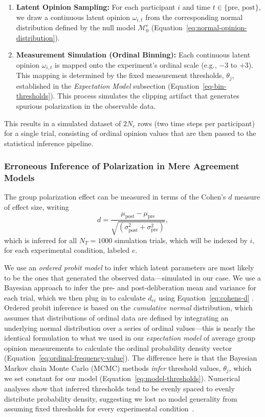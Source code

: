 \documentclass[preview]{article}
\newcommand{\mupre}{\mu_\mathrm{pre}}
\newcommand{\mupost}{\mu_\mathrm{post}}
\newcommand{\sigmapre}{\sigma_\mathrm{pre}}
\newcommand{\sigmapost}{\sigma_\mathrm{post}}
\newcommand{\nullmodel}{\mathcal{M}_0}
\begin{document}
\begin{enumerate}
\def\labelenumi{\arabic{enumi}.}
\item
  \textbf{Latent Opinion Sampling:} For each participant $i$ and time
  $t \in \{\text{pre, post}\}$, we draw a continuous latent opinion
  $\omega_{i,t}$ from the corresponding normal distribution defined by
  the null model $\nullmodel^e$ (Equation~\ref{eq:normal-opinion-distribution}).
\item
  \textbf{Measurement Simulation (Ordinal Binning):} Each continuous
  latent opinion $\omega_{i,t}$ is mapped onto the experiment's
  ordinal scale (e.g., $-3$ to $+3$). This mapping is determined by
  the fixed measurement thresholds, $\theta_j$, established in the
  \emph{Expectation Model} subsection
  (Equation~\ref{eq-bin-thresholds}). This process simulates the
  clipping artifact that generates spurious polarization in the
  observable data.
\end{enumerate}

This results in a simulated dataset of $2N_e$ rows (two time steps per
participant) for a single trial, consisting of ordinal opinion values
that are then passed to the statistical inference pipeline.


\subsubsection{Erroneous Inference of Polarization in Mere Agreement Models}
\label{erroneous-inference-model}

The group polarization effect can be measured in terms of the Cohen's $d$ measure of
effect size, writing
\begin{equation}
  d = \frac{\mupost - \mupre}{\sqrt{(\sigmapost^2 + \sigmapre^2)}},
  \label{eq:cohens-d}
\end{equation}
\noindent
which is inferred for all $N_T=1000$ simulation trials, which will be indexed by
$i$, for each experimental condition, labeled $e$.

We use an \emph{ordered probit model} to infer which latent parameters 
are most likely to be the ones that generated the observed data—simulated in our
case. We use a Bayesian approach to infer the pre- and post-deliberation mean
and variance for each trial, which we then plug in to calculate $d_{ei}$ 
using Equation~\ref{eq:cohens-d} \cite{Liddell2018}. Ordered
probit inference is based on the \emph{cumulative normal} distribution, which
assumes that distributions of ordinal data are defined by integrating an underlying
normal distribution over a series of ordinal values—this is nearly the identical
formulation to what we used in our \emph{expectation model} of average group opinion
measurements to calculate the ordinal probability density vector 
(Equation~\ref{eq:ordinal-frequency-value}). The difference here is that
the Bayesian Markov chain Monte Carlo (MCMC) methods \emph{infer} threshold values,
$\theta_j$, which we set constant for our model 
(Equation~\ref{eq:model-thresholds}). Numerical analyses show that inferred
thresholds tend to be evenly spaced to evenly distribute probability density, 
suggesting we lost no model generality from assuming fixed thresholds for every
experimental condition~\cite[Ch.  23]{Kruschke2015}.
\end{document}
